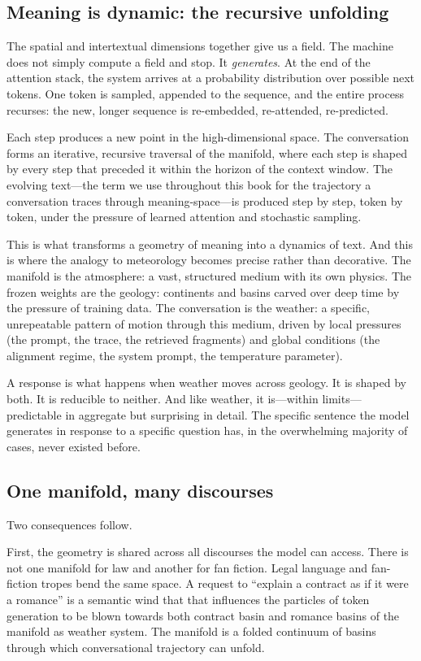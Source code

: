 \subsection{Meaning is dynamic: the recursive unfolding}

The spatial and intertextual dimensions together give us a field. The machine does not simply compute a field and stop. It \emph{generates}. At the end of the attention stack, the system arrives at a probability distribution over possible next tokens. One token is sampled, appended to the sequence, and the entire process recurses: the new, longer sequence is re-embedded, re-attended, re-predicted.

Each step produces a new point in the high-dimensional space. The conversation forms an iterative, recursive traversal of the manifold, where each step is shaped by every step that preceded it within the horizon of the context window. The evolving text---the term we use throughout this book for the trajectory a conversation traces through meaning-space---is produced step by step, token by token, under the pressure of learned attention and stochastic sampling.

This is what transforms a geometry of meaning into a dynamics of text. And this is where the analogy to meteorology becomes precise rather than decorative. The manifold is the atmosphere: a vast, structured medium with its own physics. The frozen weights are the geology: continents and basins carved over deep time by the pressure of training data. The conversation is the weather: a specific, unrepeatable pattern of motion through this medium, driven by local pressures (the prompt, the trace, the retrieved fragments) and global conditions (the alignment regime, the system prompt, the temperature parameter).

A response is what happens when weather moves across geology. It is shaped by both. It is reducible to neither. And like weather, it is---within limits---predictable in aggregate but surprising in detail. The specific sentence the model generates in response to a specific question has, in the overwhelming majority of cases, never existed before.

\subsection{One manifold, many discourses}

Two consequences follow.

First, the geometry is shared across all discourses the model can access. There is not one manifold for law and another for fan fiction. Legal language and fan-fiction tropes bend the same space. A request to ``explain a contract as if it were a romance'' is a semantic wind that that influences the particles of token generation to be blown towards both contract basin and romance basins of the manifold as weather system. The manifold is a folded continuum of basins through which conversational trajectory can unfold.

